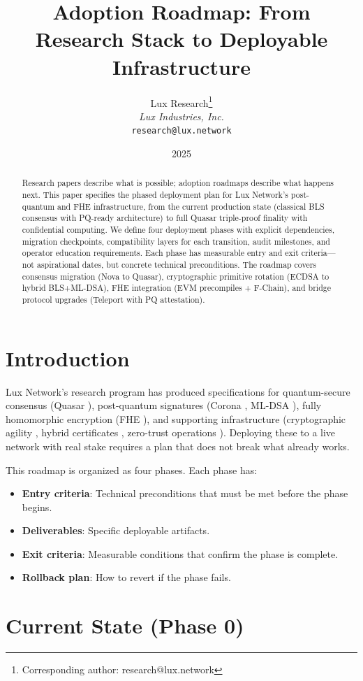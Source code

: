 \documentclass[11pt]{article}
\title{Adoption Roadmap: From Research Stack to Deployable Infrastructure}
\author{
Lux Research\thanks{Corresponding author: research@lux.network}\\
\textit{Lux Industries, Inc.}\\
\texttt{research@lux.network}
}
\date{2025}
\begin{document}
\luxcoverpage

\begin{abstract}
Research papers describe what is possible; adoption roadmaps describe what happens next. This paper specifies the phased deployment plan for Lux Network's post-quantum and FHE infrastructure, from the current production state (classical BLS consensus with PQ-ready architecture) to full Quasar triple-proof finality with confidential computing. We define four deployment phases with explicit dependencies, migration checkpoints, compatibility layers for each transition, audit milestones, and operator education requirements. Each phase has measurable entry and exit criteria---not aspirational dates, but concrete technical preconditions. The roadmap covers consensus migration (Nova to Quasar), cryptographic primitive rotation (ECDSA to hybrid BLS+ML-DSA), FHE integration (EVM precompiles + F-Chain), and bridge protocol upgrades (Teleport with PQ attestation).
\end{abstract}

\section{Introduction}

Lux Network's research program has produced specifications for quantum-secure consensus (Quasar \cite{quasar}), post-quantum signatures (Corona \cite{corona}, ML-DSA \cite{pq-suite}), fully homomorphic encryption (FHE \cite{fhe-api, fhe-benchmarks}), and supporting infrastructure (cryptographic agility \cite{crypto-agility}, hybrid certificates \cite{hybrid-certs}, zero-trust operations \cite{zero-trust}). Deploying these to a live network with real stake requires a plan that does not break what already works.

This roadmap is organized as four phases. Each phase has:
\begin{itemize}
\item \textbf{Entry criteria}: Technical preconditions that must be met before the phase begins.
\item \textbf{Deliverables}: Specific deployable artifacts.
\item \textbf{Exit criteria}: Measurable conditions that confirm the phase is complete.
\item \textbf{Rollback plan}: How to revert if the phase fails.
\end{itemize}

\section{Current State (Phase 0)}
\end{document}
